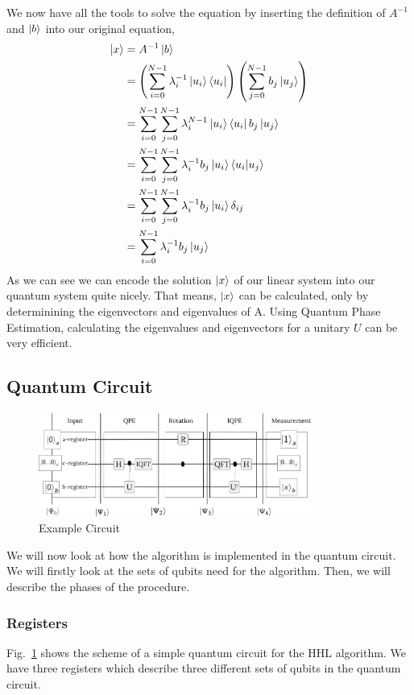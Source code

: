 We now have all the tools to solve the equation by inserting the definition of $A^{-1}$ and $\ket b$ into our original equation,
\begin{equation}
\begin{split}
\ket{x} &= A^{-1} \ket{b}\\
&=\left(\sum_{i=0}^{N-1} \lambda_i^{-1} \ket{u_i}\bra{u_i} \right) \left(\sum_{j=0}^{N-1} b_j\ket{u_j} \right) \\
&=\sum_{i=0}^{N-1} \sum_{j=0}^{N-1} \lambda_i^{N-1} \ket{u_i}\bra{u_i} b_j\ket{u_j}\\
&=\sum_{i=0}^{N-1} \sum_{j=0}^{N-1} \lambda_i^{-1} b_j\ket{u_i}\braket{u_i| u_j}\\
&=\sum_{i=0}^{N-1} \sum_{j=0}^{N-1} \lambda_i^{-1} b_j\ket{u_i}\delta_{ij}\\
&=\sum_{i=0}^{N-1} \lambda_i^{-1} b_j\ket{u_j}\\
\end{split}
\end{equation}
As we can see we can encode the solution $\ket x$ of our linear system into our quantum system quite nicely.
That means, $\ket x$ can be calculated, only by determinining the eigenvectors and eigenvalues of A. 
Using Quantum Phase Estimation, calculating the eigenvalues and eigenvectors for a unitary $U$ can be very efficient.



\subsection{Quantum Circuit}

\begin{figure}
    \centering
    \includegraphics[width=9.0cm]{img/example_circuit_cropped.png}
    \caption{Example Circuit}
    \label{ex_circ}
\end{figure}


We will now look at how the algorithm is implemented in the quantum circuit. 
We will firstly look at the sets of qubits need for the algorithm. 
Then, we will describe the phases of the procedure.

\subsubsection{Registers}
Fig.~\ref{ex_circ} shows the scheme of a simple quantum circuit for the HHL algorithm.
We have three registers which describe three different sets of qubits in the quantum circuit.


